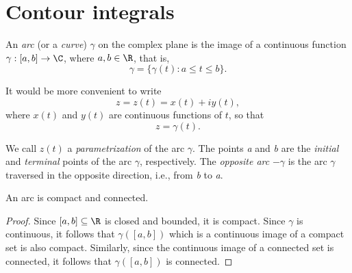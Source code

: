 \section{Contour integrals}

\begin{definition}
    An \emph{arc} (or a \emph{curve}) \(\gamma\) on the complex plane is the
    image of a continuous function \(\gamma : [a, b] \to \C\), where \(a, b \in
    \R\), that is,
    \[
        \gamma = \{\gamma(t) : a \leq t \leq b\}.
    \]
\end{definition}

It would be more convenient to write
\[
    z = z(t) = x(t) + iy(t),
\]
where \(x(t)\) and \(y(t)\) are continuous functions of \(t\), so that
\[
    z = \gamma(t).
\]

We call \(z(t)\) a \emph{parametrization} of the arc \(\gamma\). The points
\emph{a} and \emph{b} are the \emph{initial} and \emph{terminal} points of the
arc \(\gamma\), respectively. The \emph{opposite arc} \(-\gamma\) is the arc
\(\gamma\) traversed in the opposite direction, i.e., from \emph{b} to \emph{a}.

\begin{theorem}
    An arc is compact and connected.
\end{theorem}

\begin{proof}
    Since \([a, b] \subseteq \R\) is closed and bounded, it is compact. Since
    \(\gamma\) is continuous, it follows that \(\gamma([a, b])\) which is a
    continuous image of a compact set is also compact. Similarly, since the
    continuous image of a connected set is connected, it follows that
    \(\gamma([a, b])\) is connected.
\end{proof}

